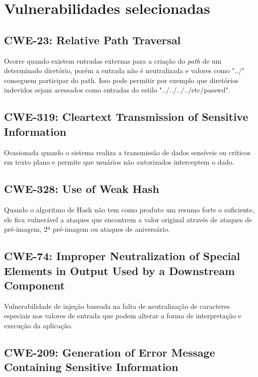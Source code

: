 \section{Vulnerabilidades selecionadas}

\subsection{CWE-23: Relative Path Traversal}

Ocorre quando existem entradas externas para a criação do \textit{path} de um determinado diretório, porém a entrada não é neutralizada e valores como "../" conseguem participar do path. Isso pode permitir por exemplo que diretórios indevidos sejam acessados como entradas do estilo "../../../../etc/passwd".

\subsection{CWE-319: Cleartext Transmission of Sensitive Information}

Ocasionada quando o sistema realiza a transmissão de dados sensíveis ou críticos em texto plano e permite que usuários não autorizados interceptem o dado.

\subsection{CWE-328: Use of Weak Hash}

Quando o algoritmo de Hash não tem como produto um resumo forte o suficiente, ele fica vulnerável a ataques que encontrem a valor original através de ataques de pré-imagem, 2ª pré-imagem ou ataques de aniversário.

\subsection{CWE-74: Improper Neutralization of Special Elements in Output Used by a Downstream Component}

Vulnerabilidade de injeção baseada na falta de neutralização de caracteres especiais nos valores de entrada que podem alterar a forma de interpretação e execução da aplicação.

\subsection{CWE-209: Generation of Error Message Containing Sensitive Information}

